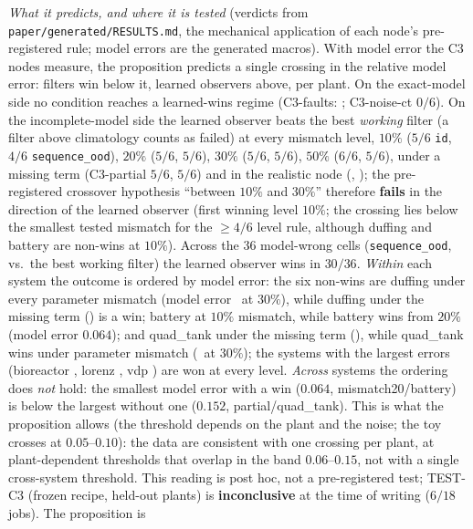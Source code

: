 {\sloppy\emph{What it predicts, and where it is tested} (verdicts from \texttt{paper/generated/RESULTS.md}, the mechanical
application of each node's pre-registered rule; model errors are the generated macros). With model error the C3 nodes
measure, the proposition predicts a single crossing in the relative model error: filters win below it, learned observers
above, per plant. On the exact-model side no condition reaches a learned-wins regime (C3-faults: \CthreeFaultsRegimes;
C3-noise-ct $0/6$). On the
incomplete-model side the learned observer beats the best \emph{working} filter (a filter above climatology counts as
failed) at every mismatch level, $10\%$ ($5/6$ \texttt{id}, $4/6$ \texttt{sequence\_ood}), $20\%$ ($5/6$, $5/6$), $30\%$
($5/6$, $5/6$), $50\%$ ($6/6$, $5/6$), under a missing term (C3-partial $5/6$, $5/6$) and in the realistic node
(\CthreeRealisticIdVsWorking, \CthreeRealisticSeqVsWorking); the pre-registered crossover hypothesis ``between $10\%$ and
$30\%$'' therefore \textbf{fails} in the direction of the learned observer (first winning level $10\%$; the crossing lies
below the smallest tested mismatch for the $\ge4/6$ level rule, although duffing and battery are non-wins at $10\%$).
Across the $36$ model-wrong cells (\texttt{sequence\_ood}, vs.\ the best working filter) the learned observer wins in
$30/36$. \emph{Within} each system the outcome is ordered by model error: the six non-wins are duffing under every
parameter mismatch (model error \ModelErrDuffingMismatchThirty\ at $30\%$), while duffing under the missing term
(\ModelErrDuffingPartial) is a win; battery at $10\%$ mismatch, while battery wins from $20\%$ (model error $0.064$); and
quad\_tank under the missing term (\ModelErrQuadTankPartial), while quad\_tank wins under parameter mismatch
(\ModelErrQuadTankMismatchThirty\ at $30\%$); the systems with the largest errors (bioreactor \ModelErrBioreactorPartial,
lorenz \ModelErrLorenzPartial, vdp \ModelErrVdpPartial) are won at every level. \emph{Across} systems the ordering does
\emph{not} hold: the smallest model error with a win ($0.064$, mismatch20/battery) is below the largest without one
($0.152$, partial/quad\_tank). This is what the proposition allows (the threshold depends on the plant and the noise;
the toy crosses at $0.05$--$0.10$): the data are consistent with one crossing per plant, at plant-dependent thresholds
that overlap in the band $0.06$--$0.15$, not with a single cross-system threshold. This reading is post hoc, not a
pre-registered test; TEST-C3 (frozen recipe, held-out plants) is \textbf{inconclusive} at the time of writing ($6/18$ jobs). The proposition is
}
